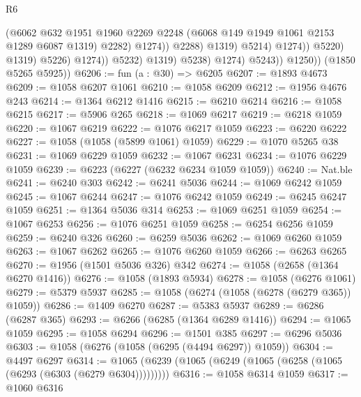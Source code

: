 \begin{lexlean}{R6}
\begin{coremodule}
                                              (@6062
                                                @632
                                                @1951
                                                @1960
                                                @2269
                                                @2248
                                                (@6068 @149 @1949 @1061 @2153 @1289 @6087 @1319)
                                                @2282)
                                              @1274))
                                          @2288)
                                        @1319)
                                      @5214)
                                    @1274))
                                @5220)
                              @1319)
                            @5226)
                          @1274))
                      @5232)
                    @1319)
                  @5238)
                @1274)
              @5243))
          @1250))
      (@1850 @5265 @5925))
@6206 := fun (a : @30) => @6205
@6207 := @1893 @4673
@6209 := @1058 @6207 @1061
@6210 := @1058 @6209
@6212 := @1956 @4676 @243
@6214 := @1364 @6212 @1416
@6215 := @6210 @6214
@6216 := @1058 @6215
@6217 := @5906 @265
@6218 := @1069 @6217
@6219 := @6218 @1059
@6220 := @1067 @6219
@6222 := @1076 @6217 @1059
@6223 := @6220 @6222
@6227 := @1058 (@1058 (@5899 @1061) @1059)
@6229 := @1070 @5265 @38
@6231 := @1069 @6229 @1059
@6232 := @1067 @6231
@6234 := @1076 @6229 @1059
@6239 := @6223 (@6227 (@6232 @6234 @1059 @1059))
@6240 := Nat.ble
@6241 := @6240 @303
@6242 := @6241 @5036
@6244 := @1069 @6242 @1059
@6245 := @1067 @6244
@6247 := @1076 @6242 @1059
@6249 := @6245 @6247 @1059
@6251 := @1364 @5036 @314
@6253 := @1069 @6251 @1059
@6254 := @1067 @6253
@6256 := @1076 @6251 @1059
@6258 := @6254 @6256 @1059
@6259 := @6240 @326
@6260 := @6259 @5036
@6262 := @1069 @6260 @1059
@6263 := @1067 @6262
@6265 := @1076 @6260 @1059
@6266 := @6263 @6265
@6270 := @1956 (@1501 @5036 @326) @342
@6274 := @1058 (@2658 (@1364 @6270 @1416))
@6276 := @1058 (@1893 @5934)
@6278 := @1058 (@6276 @1061)
@6279 := @5379 @5937
@6285 := @1058 (@6274 (@1058 (@6278 (@6279 @365)) @1059))
@6286 := @1409 @6270
@6287 := @5383 @5937
@6289 := @6286 (@6287 @365)
@6293 := @6266 (@6285 (@1364 @6289 @1416))
@6294 := @1065 @1059
@6295 := @1058 @6294
@6296 := @1501 @385
@6297 := @6296 @5036
@6303 := @1058 (@6276 (@1058 (@6295 (@4494 @6297)) @1059))
@6304 := @4497 @6297
@6314 := @1065 (@6239 (@1065 (@6249 (@1065 (@6258 (@1065 (@6293 (@6303 (@6279 @6304)))))))))
@6316 := @1058 @6314 @1059
@6317 := @1060 @6316

\end{coremodule}
\end{lexlean}
